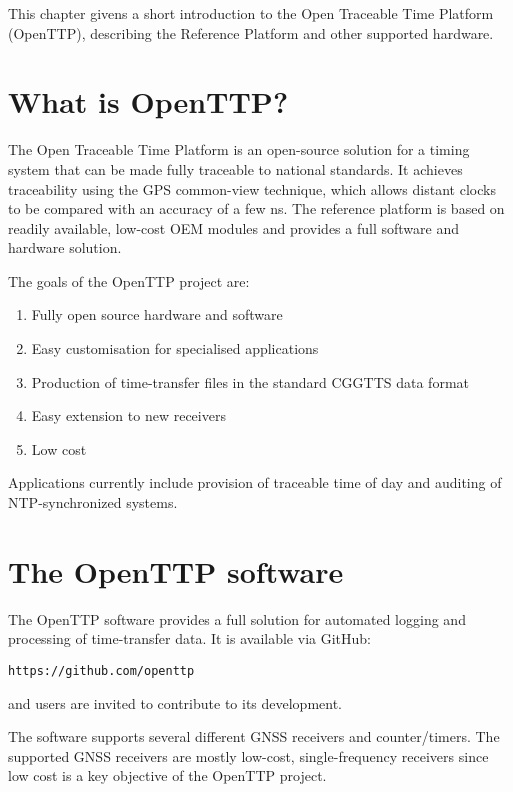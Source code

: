 


This chapter givens a short introduction to the Open Traceable Time Platform (OpenTTP), describing the Reference Platform and other supported hardware.

\section{What is OpenTTP?}

The Open Traceable Time Platform is an open-source solution for a timing system that can be made fully traceable to national standards.
It achieves traceability using the GPS common-view technique, which allows distant clocks to be compared with an accuracy of a few ns.
The reference platform is based on readily available, low-cost OEM modules and provides a full software and hardware solution. 

The goals of the OpenTTP project are:
\begin{enumerate}

	\item Fully open source hardware and software 
	
	\item Easy customisation for specialised applications
	
	\item Production of time-transfer files in the standard CGGTTS data format
	
	\item Easy extension to new receivers

	\item Low cost 

\end{enumerate}

Applications currently include provision of traceable time of day and auditing of NTP-synchronized systems.

\section{The OpenTTP software}

The OpenTTP software provides a full solution for automated logging and processing of time-transfer data.
It is available via GitHub:
\begin{lstlisting}
https://github.com/openttp
\end{lstlisting}
and users are invited to contribute to its development.

The software supports several different GNSS receivers and counter/timers. 
The supported GNSS receivers are mostly low-cost, single-frequency receivers since low cost is a key objective of 
the OpenTTP project.
	
